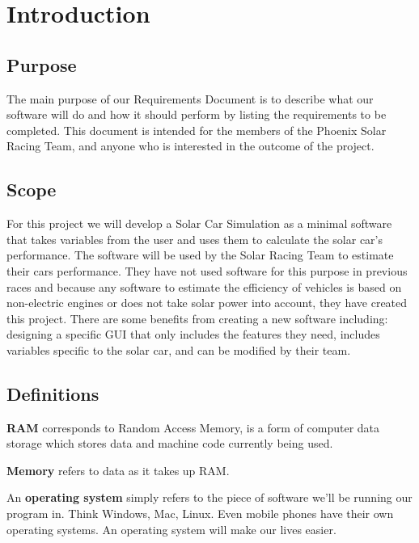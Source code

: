 \documentclass[onecolumn, draftclsnofoot,10pt, compsoc]{IEEEtran}
\begin{document}
\section{Introduction}
    
    \subsection{Purpose}
    The main purpose of our Requirements Document is to describe what our software will do and how it should perform by listing the requirements to be completed.
    This document is intended for the members of the Phoenix Solar Racing Team, and anyone who is interested in the outcome of the project.
    
    \subsection{Scope}
    For this project we will develop a Solar Car Simulation as a minimal software that takes variables from the user and uses them to calculate the solar car's performance.
    The software will be used by the Solar Racing Team to estimate their cars performance. 
    They have not used software for this purpose in previous races and because any software to estimate the efficiency of vehicles is based on non-electric engines or does not take solar power into account, they have created this project. There are some benefits from creating a new software including: designing a specific GUI that only includes the features they need, includes variables specific to the solar car, and can be modified by their team.
    
    \subsection{Definitions}
    \textbf{RAM} corresponds to Random Access Memory, is a form of computer data storage which stores data and machine code currently being used.
    
    \vspace{.1cm}
    \noindent \textbf{Memory} refers to data as it takes up RAM.
    
    \vspace{.1cm}
    \noindent An \textbf{operating system} simply refers to the piece of software we'll be running our program in.
    Think Windows, Mac, Linux.
    Even mobile phones have their own operating systems.
    An operating system will make our lives easier.
    
\end{document}
